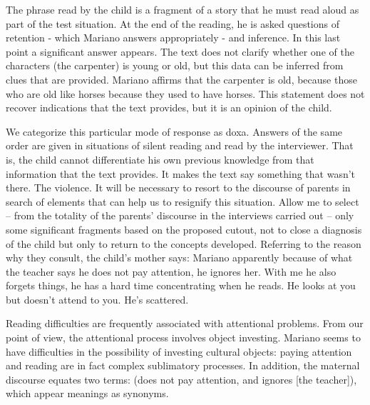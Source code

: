 \documentclass[english]{textolivre}
\begin{document}
The phrase read by the child is a fragment of a story that he must read aloud as part of the test situation. At the end of the reading, he is asked questions of retention - which Mariano answers appropriately - and inference. In this last point a significant answer appears. The text does not clarify whether one of the characters (the carpenter) is young or old, but this data can be inferred from clues that are provided. Mariano affirms that the carpenter is old, because those who are old like horses because they used to have horses. This statement does not recover indications that the text provides, but it is an opinion of the child.

We categorize this particular mode of response as doxa. Answers of the same order are given in situations of silent reading and read by the interviewer. That is, the child cannot differentiate his own previous knowledge from that information that the text provides. It makes the text say something that wasn't there. The violence. It will be necessary to resort to the discourse of parents in search of elements that can help us to resignify this situation. Allow me to select – from the totality of the parents' discourse in the interviews carried out – only some significant fragments based on the proposed cutout, not to close a diagnosis of the child but only to return to the concepts developed. Referring to the reason why they consult, the child's mother says: Mariano apparently because of what the teacher says he does not pay attention, he ignores her. With me he also forgets things, he has a hard time concentrating when he reads. He looks at you but doesn't attend to you. He’s scattered.

Reading difficulties are frequently associated with attentional problems. From our point of view, the attentional process involves object investing. Mariano seems to have difficulties in the possibility of investing cultural objects: paying attention and reading are in fact complex sublimatory processes. In addition, the maternal discourse equates two terms: (does not pay attention, and ignores [the teacher]), which appear meanings as synonyms.
\end{document}
